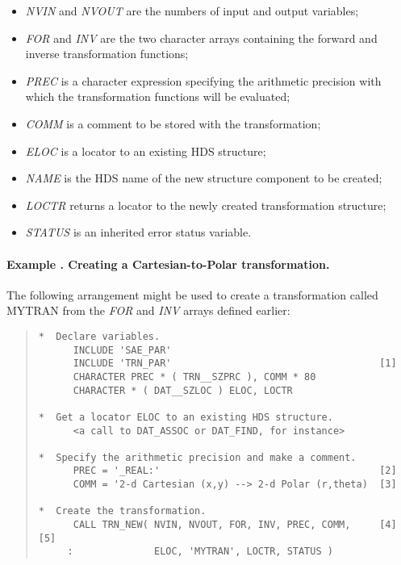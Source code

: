 \documentclass[twoside,11pt]{article}
\renewcommand{\_}{\texttt{\symbol{95}}}
\newcommand{\name}[1]{\mbox{\small{#1}}}
\newcommand{\fortvar}[1]{\mbox{\emph{#1}}}
\newcounter{examplecounter}
\newcommand{\example}[1]{\addtocounter{examplecounter}{1}
                         \paragraph{\textbf{Example \theexamplecounter. #1}}}
\begin{document}
\begin{itemize}

\item \fortvar{NVIN} and \fortvar{NVOUT} are the numbers of input and output
variables;

\item \fortvar{FOR} and \fortvar{INV} are the two character arrays
containing the forward and inverse transformation functions;

\item \fortvar{PREC} is a character expression specifying the arithmetic
precision with which the transformation functions will be evaluated;

\item \fortvar{COMM} is a comment to be stored with the transformation;

\item \fortvar{ELOC} is a locator to an existing \name{HDS} structure;

\item \fortvar{NAME} is the \name{HDS} name of the new structure component
to be created;

\item \fortvar{LOCTR} returns a locator to the newly created transformation
structure;

\item \fortvar{STATUS} is an inherited error status variable.

\end{itemize}

\example{Creating a Cartesian-to-Polar transformation.}
The following arrangement might be used to create a transformation called
\name{MYTRAN} from the \fortvar{FOR} and \fortvar{INV} arrays defined
earlier:

\begin{quote}
\begin{verbatim}
*  Declare variables.
      INCLUDE 'SAE_PAR'
      INCLUDE 'TRN_PAR'                                    [1]
      CHARACTER PREC * ( TRN__SZPRC ), COMM * 80
      CHARACTER * ( DAT__SZLOC ) ELOC, LOCTR

*  Get a locator ELOC to an existing HDS structure.
      <a call to DAT_ASSOC or DAT_FIND, for instance>

*  Specify the arithmetic precision and make a comment.
      PREC = '_REAL:'                                      [2]
      COMM = '2-d Cartesian (x,y) --> 2-d Polar (r,theta)  [3]

*  Create the transformation.
      CALL TRN_NEW( NVIN, NVOUT, FOR, INV, PREC, COMM,     [4][5]
     :              ELOC, 'MYTRAN', LOCTR, STATUS )

\end{verbatim}
\end{quote}
\end{document}
